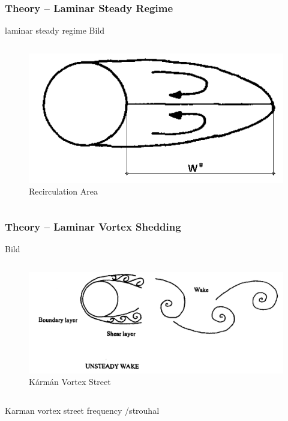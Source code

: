 	\begin{frame}
		\frametitle{Theory -- Laminar Steady Regime}
		laminar steady regime
		Bild
		\begin{columns}[t]
		\column[]{7cm}
		\column[]{5cm}
		\begin{figure}[htbp]
			\vspace{-1cm}
			\includegraphics[width=\textwidth]{img/steadyFlow_modifiedWilliamson.PNG}
			\caption{Recirculation Area \cite{williamson}}
		
		\end{figure} 
		\end{columns}

	\end{frame}	
	\begin{frame}
		\frametitle{Theory -- Laminar Vortex Shedding}
		Bild
		\begin{columns}[t]
			\column[]{5cm}
			\column[]{7cm}
			\begin{figure}[htbp]
				\vspace{-1cm}
				\includegraphics[width=\textwidth]{img/unsteady_Williamson.PNG}
				\caption{Kármán Vortex Street \cite{williamson} }
			\end{figure} 
		\end{columns}
		Karman vortex street
		frequency /strouhal
	\end{frame}	
